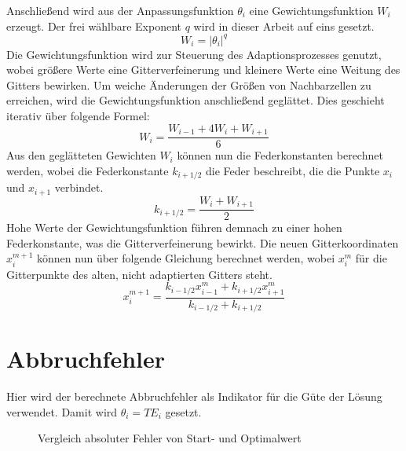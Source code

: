 Anschließend wird aus der Anpassungsfunktion $\theta_i$ eine Gewichtungsfunktion
$W_i$ erzeugt.
Der frei wählbare Exponent $q$ wird in dieser Arbeit auf eins gesetzt.
\begin{equation}
  W_i = \vert\theta_i \vert^q
\end{equation}
Die Gewichtungsfunktion wird zur Steuerung des Adaptionsprozesses genutzt, wobei größere
Werte eine Gitterverfeinerung und kleinere Werte eine Weitung des Gitters bewirken. Um
weiche Änderungen der Größen von Nachbarzellen zu erreichen, wird die Gewichtungsfunktion
anschließend geglättet. Dies geschieht iterativ über folgende Formel:
\begin{equation}
  W_i = \frac{W_{i-1} + 4W_i + W_{i+1}}{6}
\end{equation}
Aus den geglätteten Gewichten $W_i$ können nun die Federkonstanten berechnet werden, wobei
die Federkonstante $k_{i+1/2}$ die Feder beschreibt, die die Punkte $x_{i}$ und $x_{i+1}$ verbindet.
\begin{equation}
  k_{i+1/2} = \frac{W_i + W_{i+1}}{2}
\end{equation}
Hohe Werte der Gewichtungsfunktion führen demnach zu einer hohen Federkonstante, was die
Gitterverfeinerung bewirkt. Die neuen Gitterkoordinaten $x_i^{m+1}$ können nun über folgende
Gleichung berechnet werden, wobei $x_i^m$ für die Gitterpunkte des alten, nicht adaptierten
Gitters steht.
\begin{equation}
  x_i^{m+1} = \frac{k_{i-1/2} x_{i-1}^m + k_{i+1/2} x_{i+1}^m}{k_{i-1/2} + k_{i+1/2}}
\end{equation}


\section{Abbruchfehler}

Hier wird der berechnete Abbruchfehler als Indikator für die Güte der Lösung verwendet.
Damit wird $\theta_i = TE_i$ gesetzt.
\begin{figure}[h]
\centering
{}
\caption{Vergleich absoluter Fehler von Start- und Optimalwert}
\end{figure}


